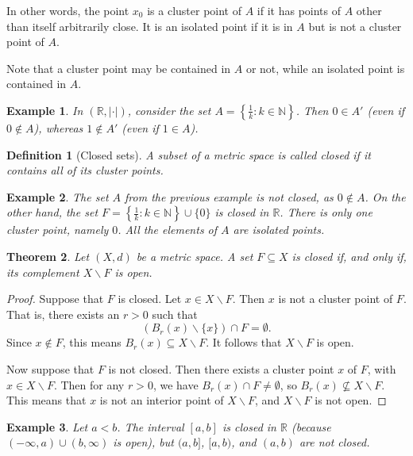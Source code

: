 \documentclass[a4paper,reqno]{amsart}
\numberwithin{equation}{section}
\newtheorem{definition}{Definition}[section]
\newtheorem{theorem}[definition]{Theorem}
\newtheorem{example}{Example}
\def\N{\mathbb{N}}
\def\R{\mathbb{R}}
\begin{document}
In other words, the point $x_0$ is a cluster point of $A$ if it has points
of $A$ other than itself arbitrarily close. It is an isolated point if it is in $A$ but is not a cluster point of $A$.

Note that a cluster point may be contained in $A$ or not, while an isolated point is contained in $A$.


\begin{example}
In $(\R, |\cdot|)$, consider the set $A = \left\{\frac{1}{k}: k \in \N\right\}$. Then $0 \in A'$ (even if $0\notin A$), whereas $1 \not\in A'$ (even if $1\in A$).
\end{example}

\begin{definition}[Closed sets]
A subset of a metric space is called \emph{closed} if it contains
all of its cluster points.
\end{definition}

\begin{example}
The set $A$ from the previous example is not closed, as $0 \not\in A$.
On the other hand, the set $F = \left\{\frac{1}{k}: k \in \N\right\} \cup \{0\}$ is closed in $\R$.
There is only one cluster point, namely $0$. All the elements of $A$ are isolated points.
\end{example}

\begin{theorem} \label{thm:complement}
Let $(X,d)$ be a metric space. A set $F \subseteq X$ is closed if, and only if, its complement
$X \backslash F$ is open.
\end{theorem}

\begin{proof}
Suppose that $F$ is closed. Let $x \in X \backslash F$. Then $x$ is not a cluster point of $F$.
That is, there exists an $r > 0$ such that
\[
(B_r(x) \backslash \{x\}) \cap F = \emptyset.
\]
Since $x \not\in F$, this means $B_r(x) \subseteq X \backslash F$. It follows that
$X \backslash F$ is open.

Now suppose that $F$ is not closed. Then there exists a cluster point $x$ of $F$, with
$x \in X \backslash F$. Then for any $r > 0$, we have $B_r(x) \cap F \not= \emptyset$,
so $B_r(x) \not\subseteq X \backslash F$. This means that $x$ is not an interior point
of $X \backslash F$, and $X \backslash F$ is not open.
\end{proof}

\begin{example}
Let $a < b$. The interval $[a,b]$ is closed in $\R$ (because $(-\infty,a) \cup (b,\infty)$ is open),
but $(a,b]$, $[a,b)$, and $(a,b)$ are not closed.
\end{example}
\end{document}
